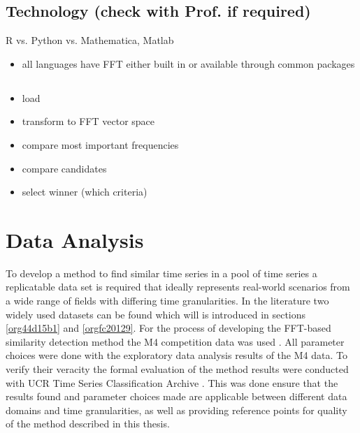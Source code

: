 \documentclass[phd,black, hidelinks]{PrincetonThesis}
\begin{document}
\section{Technology (check with Prof. if required)}
\label{sec:org0559003}
R vs. Python vs. Mathematica, Matlab
\begin{itemize}
\item all languages have FFT either built in or available through common packages
\end{itemize}
\section{}
\label{sec:org1e04724}
\begin{itemize}
\item load
\item transform to FFT vector space
\item compare most important frequencies
\item compare candidates
\item select winner (which criteria)
\end{itemize}
\chapter{Data Analysis}
\label{sec:org693a181}
To develop a method to find similar time series in a pool of time series a replicatable data set is required that ideally represents real-world scenarios from a wide range of fields with differing time granularities. In the literature two widely used datasets can be found which will is introduced in sections \ref{org44d15b1} and \ref{orgfc20129}. For the process of developing the FFT-based similarity detection method the M4 competition data was used \cite{M4CompetitionArchive2018}. All parameter choices were done with the exploratory data analysis results of the M4 data. To verify their veracity the formal evaluation of the method results were conducted with UCR Time Series Classification Archive \cite{UCRArchive2018}. This was done ensure that the results found and parameter choices made are applicable between different data domains and time granularities, as well as providing reference points for quality of the method described in this thesis.
\end{document}
